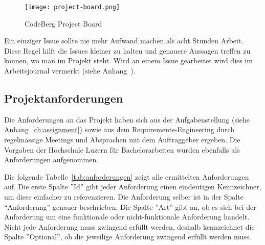 \begin{figure*}[ht]
    \texttt{[image: project-board.png]}
    \caption{CodeBerg Project Board}
    \label{fig:projectboard}
\end{figure*}

Ein einziger Issue sollte nie mehr Aufwand machen als acht Stunden Arbeit. Diese Regel hilft die Issues kleiner zu halten und genauere Aussagen treffen zu können, wo man im Projekt steht.
Wird an einem Issue gearbeitet wird dies im Arbeitsjournal vermerkt (siehe Anhang~).

\subsection{Projektanforderungen}
\label{sub:Anforderungen}

Die Anforderungen an das Projekt haben sich aus der Aufgabenstellung (siehe Anhang~\ref{ch:assignment}) sowie aus dem Requirements-Engineering durch regelmässige Meetings und Absprachen mit dem Auftraggeber ergeben. Die Vorgaben der Hochschule Luzern für Bachelorarbeiten wurden ebenfalls als Anforderungen aufgenommen.

Die folgende Tabelle~\ref{tab:anforderungen} zeigt alle ermittelten Anforderungen auf.
Die erste Spalte ''Id'' gibt jeder Anforderung einen eindeutigen Kennzeichner, um diese einfacher zu referenzieren.
Die Anforderung selber ist in der Spalte ``Anforderung'' genauer beschrieben.
Die Spalte ''Art'' gibt an, ob es sich bei der Anforderung um eine funktionale oder nicht-funktionale Anforderung handelt.
Nicht jede Anforderung muss zwingend erfüllt werden, deshalb kennzeichnet die Spalte ''Optional'', ob die jeweilige Anforderung zwingend erfüllt werden muss.

